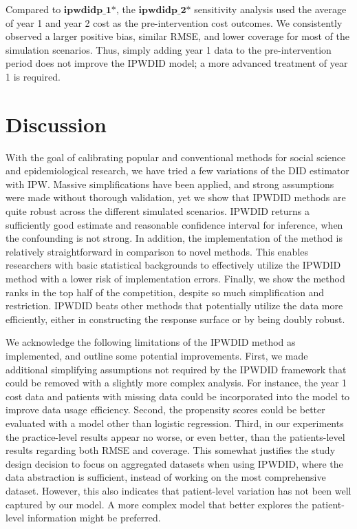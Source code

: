 \documentclass[twoside,11pt]{article}
\newcommand*{\DID}{\ensuremath{\text{DID}}\xspace}
\newcommand*{\IPW}{\ensuremath{\text{IPW}}\xspace}
\newcommand*{\IPWDID}{\ensuremath{\text{IPWDID}}\xspace}
\newcommand{\modelStyle}[1]{\ensuremath{\textbf{#1}}\xspace}
\newcommand*{\ipwdidP}{\modelStyle{ipwdidp\_1*}}
\newcommand*{\ipwdidPtwo}{\modelStyle{ipwdidp\_2*}}
\begin{document}
Compared to \ipwdidP, the \ipwdidPtwo sensitivity analysis used
the average of year 1 and year 2 cost as the pre-intervention cost outcomes.
We consistently observed a larger positive bias, similar RMSE, and lower coverage for most of the simulation scenarios.
Thus, simply adding year 1 data to the pre-intervention period does not improve the \IPWDID model;
a more advanced treatment of year 1 is required.

\section{Discussion}
\label{discussion}

With the goal of calibrating popular and conventional methods for social science and epidemiological research,
we have tried a few variations of the \DID estimator with \IPW.
Massive simplifications have been applied,
and strong assumptions were made without thorough validation,
yet we show that \IPWDID methods are quite robust across the different simulated scenarios.
\IPWDID returns a sufficiently good estimate and reasonable confidence interval for inference,
when the confounding is not strong.
In addition, the implementation of the method is relatively straightforward in comparison to novel methods.
This enables researchers with basic statistical backgrounds to
effectively utilize the \IPWDID method with a lower risk of implementation errors.
Finally, we show the method ranks in the top half of the competition, despite so much simplification and restriction.
\IPWDID beats other methods that potentially utilize the data more efficiently,
either in constructing the response surface or by being doubly robust.

We acknowledge the following limitations of the \IPWDID method as implemented,
and outline some potential improvements.
First, we made additional simplifying assumptions not required by the \IPWDID framework
that could be removed with a slightly more complex analysis.
For instance, the year 1 cost data and patients with missing data
could be incorporated into the model to improve data usage efficiency.
Second, the propensity scores could be better evaluated with a model other than logistic regression.
Third, in our experiments the practice-level results appear no worse, or even better,
than the patients-level results regarding both RMSE and coverage.
This somewhat justifies the study design decision to focus on aggregated datasets when using \IPWDID,
where the data abstraction is sufficient,
instead of working on the most comprehensive dataset.
However, this also indicates that patient-level variation has not been well captured by our model.
A more complex model that better explores the patient-level information might be preferred.
\end{document}
